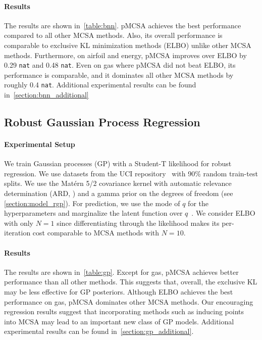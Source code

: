 \vspace{-0.1in}
\paragraph{Results}
The results are shown in~\cref{table:bnn}.
pMCSA achieves the best performance compared to all other MCSA methods.
Also, its overall performance is comparable to exclusive KL minimization methods (ELBO) unlike other MCSA methods.
Furthermore, on \textsf{airfoil} and \textsf{energy}, pMCSA improves over ELBO by 0.29 \texttt{nat} and 0.48 \texttt{nat}.
Even on \textsf{gas} where pMCSA did not beat ELBO, its performance is comparable, and it dominates all other MCSA methods by roughly 0.4 \texttt{nat}.
Additional experimental results can be found in~\cref{section:bnn_additional}

  \vspace{-0.1in}
\subsection{Robust Gaussian Process Regression}\label{section:bgp}
  \vspace{-0.07in}
\paragraph{Experimental Setup}
We train Gaussian processes (GP) with a Student-T likelihood for robust regression.
We use datasets from the UCI repository~\citep{Dua:2019} with 90\% random train-test splits.
We use the Mat\'ern 5/2 covariance kernel with automatic relevance determination (ARD, \citealt{neal_bayesian_1996}) and a gamma prior on the degrees of freedom (see \cref{section:model_rgp}).
For prediction, we use the mode of \(q\) for the hyperparameters and marginalize the latent function over \(q\)~\citep{rasmussen_gaussian_2006}.
We consider ELBO with only \(N=1\) since differentiating through the likelihood makes its per-iteration cost comparable to MCSA methods with \(N=10\).

\vspace{-0.1in}
\paragraph{Results}
The results are shown in~\cref{table:gp}.
Except for \textsf{gas}, pMCSA achieves better performance than all other methods.
This suggests that, overall, the exclusive KL may be less effective for GP posteriors.
Although ELBO achieves the best performance on \textsf{gas}, pMCSA dominates other MCSA methods.
Our encouraging regression results suggest that incorporating methods such as inducing points~\citep{NIPS2005_4491777b} into MCSA may lead to an important new class of GP models.
Additional experimental results can be found in~\cref{section:gp_additional}.

